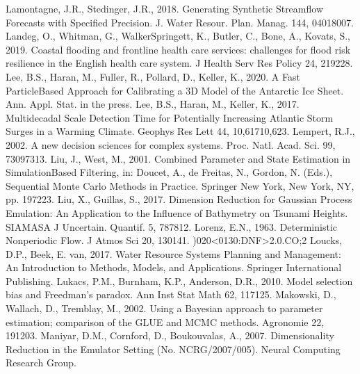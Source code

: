 \documentclass[letterpaper,10pt,english]{sphinxmanual}
\begin{document}
Lamontagne, J.R., Stedinger, J.R., 2018. Generating Synthetic Streamflow Forecasts with Specified Precision. J. Water Resour. Plan. Manag. 144, 04018007. 
Landeg, O., Whitman, G., Walker\sphinxhyphen{}Springett, K., Butler, C., Bone, A., Kovats, S., 2019. Coastal flooding and frontline health care services: challenges for flood risk resilience in the English health care system. J Health Serv Res Policy 24, 219\textendash{}228. 
Lee, B.S., Haran, M., Fuller, R., Pollard, D., Keller, K., 2020. A Fast Particle\sphinxhyphen{}Based Approach for Calibrating a 3\sphinxhyphen{}D Model of the Antarctic Ice Sheet. Ann. Appl. Stat. in the press.
Lee, B.S., Haran, M., Keller, K., 2017. Multidecadal Scale Detection Time for Potentially Increasing Atlantic Storm Surges in a Warming Climate. Geophys Res Lett 44, 10,617\sphinxhyphen{}10,623. 
Lempert, R.J., 2002. A new decision sciences for complex systems. Proc. Natl. Acad. Sci. 99, 7309\textendash{}7313. 
Liu, J., West, M., 2001. Combined Parameter and State Estimation in Simulation\sphinxhyphen{}Based Filtering, in: Doucet, A., de Freitas, N., Gordon, N. (Eds.), Sequential Monte Carlo Methods in Practice. Springer New York, New York, NY, pp. 197\textendash{}223. 
Liu, X., Guillas, S., 2017. Dimension Reduction for Gaussian Process Emulation: An Application to the Influence of Bathymetry on Tsunami Heights. SIAMASA J Uncertain. Quantif. 5, 787\textendash{}812. 
Lorenz, E.N., 1963. Deterministic Nonperiodic Flow. J Atmos Sci 20, 130\textendash{}141. )020\textless{}0130:DNF\textgreater{}2.0.CO;2
Loucks, D.P., Beek, E. van, 2017. Water Resource Systems Planning and Management: An Introduction to Methods, Models, and Applications. Springer International Publishing.
Lukacs, P.M., Burnham, K.P., Anderson, D.R., 2010. Model selection bias and Freedman’s paradox. Ann Inst Stat Math 62, 117\textendash{}125. 
Makowski, D., Wallach, D., Tremblay, M., 2002. Using a Bayesian approach to parameter estimation; comparison of the GLUE and MCMC methods. Agronomie 22, 191\textendash{}203.
Maniyar, D.M., Cornford, D., Boukouvalas, A., 2007. Dimensionality Reduction in the Emulator Setting (No. NCRG/2007/005). Neural Computing Research Group.
\end{document}

